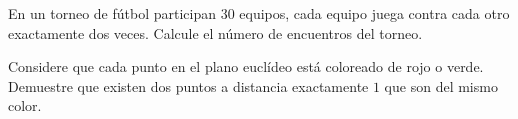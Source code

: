 \begin{problem}
En un torneo de fútbol participan $30$ equipos, cada equipo
juega contra cada otro exactamente dos veces. Calcule el número
de encuentros del torneo.
\end{problem}

\begin{problem}
Considere que cada punto en el plano euclídeo está coloreado de rojo o verde.
Demuestre que existen dos puntos a distancia exactamente $1$ que son del mismo color.
\end{problem}


